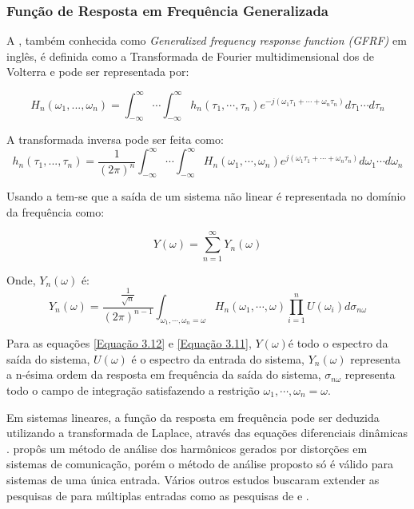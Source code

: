 \subsubsection*{Função de Resposta em Frequência Generalizada }
A \FRFG, também conhecida como \textit{Generalized frequency response function (GFRF)} em inglês, é definida como a Transformada de Fourier multidimensional dos  de Volterra e pode ser representada por:

\begin{equation}
H_{n}(\omega_{1},...,\omega_{n}) = \int_{- \infty}^{\infty}\cdots \int_{- \infty}^{\infty}h_{n}(\tau_{1},\cdots,\tau_{n})e^{-j(\omega_{1}\tau_{1}+\cdots+\omega_{n}\tau_{n})}d\tau_{1}\cdots d\tau_{n}
\label{Equação 3.8}
\end{equation}

A transformada inversa pode ser feita como:
\begin{equation}
h_{n}(\tau_{1},...,\tau_{n}) = \dfrac{1}{(2\pi)^{n}}\int_{- \infty}^{\infty}\cdots \int_{- \infty}^{\infty}H_{n}(\omega_{1},\cdots,\omega_{n})e^{j(\omega_{1}\tau_{1}+\cdots+\omega_{n}\tau_{n})}d\omega_{1}\cdots d\omega_{n}
\label{Equação 3.9}
\end{equation}

Usando a \FRFG tem-se que a saída de um sistema não linear é representada no domínio da frequência como:

\begin{equation}
Y(\omega) = \sum_{n=1}^{\infty} Y_{n}(\omega)
\label{Equação 3.11}
\end{equation}

Onde, $Y_{n}(\omega)$ é:
\begin{equation}
Y_{n}(\omega) = \dfrac{\frac{1}{\sqrt{n}}}{(2 \pi)^{n-1}}\int_{\omega_{1},\cdots,\omega_{n}=\omega}H_{n}(\omega_{1},\cdots,\omega)\prod_{i=1}^{n}U(\omega_{i}) d\sigma_{n\omega}
\label{Equação 3.12}
\end{equation}

Para as equações \ref{Equação 3.12} e \ref{Equação 3.11}, $Y(\omega)$é todo o espectro da saída do sistema, $U(\omega)$ é o espectro da entrada do sistema, $Y_{n}(\omega)$ representa a n-ésima ordem da resposta em frequência da saída do sistema, $\sigma_{n\omega}$ representa todo o campo de integração satisfazendo a restrição $\omega_{1},\cdots,\omega_{n}=\omega$.

Em sistemas lineares, a função da resposta em frequência pode ser deduzida utilizando a transformada de Laplace, através das equações diferenciais dinâmicas \cite{cheng2017volterra}. \cite{bedrosian1971output} propôs um método de análise dos harmônicos gerados por distorções em sistemas de comunicação, porém o método de análise proposto só é válido para sistemas de uma única entrada. Vários outros estudos buscaram extender as pesquisas de \cite{bedrosian1971output} para múltiplas entradas como as pesquisas de \cite{Swain} e \cite{HeFei}.

